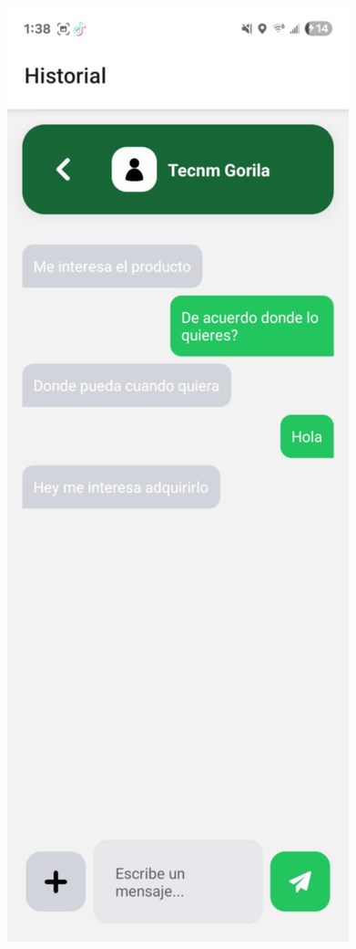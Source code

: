 \documentclass[11pt, a4paper, oneside]{book}
\begin{document}
\begin{figure}[H]
    \centering
    \begin{minipage}[b]{0.25\textwidth}
        \centering
        \includegraphics[width=\textwidth]{Pictures/3.png}

\end{minipage}
\end{figure}
\end{document}
